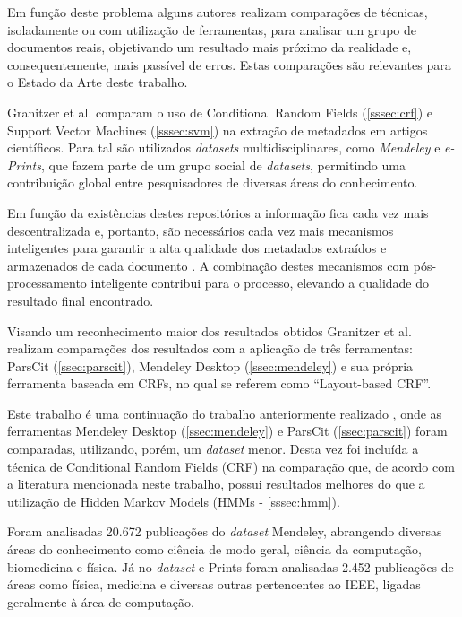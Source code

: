 Em função deste problema alguns autores realizam comparações de técnicas, isoladamente ou com utilização de ferramentas, para analisar um grupo de documentos reais, objetivando um resultado mais próximo da realidade e, consequentemente, mais passível de erros. Estas comparações são relevantes para o Estado da Arte deste trabalho.

Granitzer et al. \cite{Granitzer-2012-LayoutBased} comparam o uso de Conditional Random Fields (\autoref{sssec:crf}) e Support Vector Machines (\autoref{sssec:svm}) na extração de metadados em artigos científicos. Para tal são utilizados \emph{datasets} multidisciplinares, como \emph{Mendeley} e \emph{e-Prints}, que fazem parte de um grupo social de \emph{datasets}, permitindo uma contribuição global entre pesquisadores de diversas áreas do conhecimento.

Em função da existências destes repositórios a informação fica cada vez mais descentralizada e, portanto, são necessários cada vez mais mecanismos inteligentes para garantir a alta qualidade dos metadados extraídos e armazenados de cada documento \cite{Granitzer-2012-LayoutBased}. A combinação destes mecanismos com pós-processamento inteligente contribui para o processo, elevando a qualidade do resultado final encontrado.


Visando um reconhecimento maior dos resultados obtidos Granitzer et al. realizam comparações dos resultados com a aplicação de três ferramentas: ParsCit (\autoref{ssec:parscit}), Mendeley Desktop (\autoref{ssec:mendeley}) e sua própria ferramenta baseada em CRFs, no qual se referem como ``Layout-based CRF''.

Este trabalho \cite{Granitzer-2012-LayoutBased} é uma continuação do trabalho anteriormente realizado \cite{Granitzer-2012-Crowdsourced}, onde as ferramentas Mendeley Desktop (\autoref{ssec:mendeley}) e ParsCit (\autoref{ssec:parscit}) foram comparadas, utilizando, porém, um \emph{dataset} menor. Desta vez foi incluída a técnica de Conditional Random Fields (CRF) na comparação que, de acordo com a literatura mencionada neste trabalho, possui resultados melhores do que a utilização de Hidden Markov Models (HMMs - \autoref{sssec:hmm}).

Foram analisadas 20.672 publicações do \emph{dataset} Mendeley, abrangendo diversas áreas do conhecimento como ciência de modo geral, ciência da computação, biomedicina e física. Já no \emph{dataset} e-Prints foram analisadas 2.452 publicações de áreas como física, medicina e diversas outras pertencentes ao IEEE, ligadas geralmente à área de computação.

